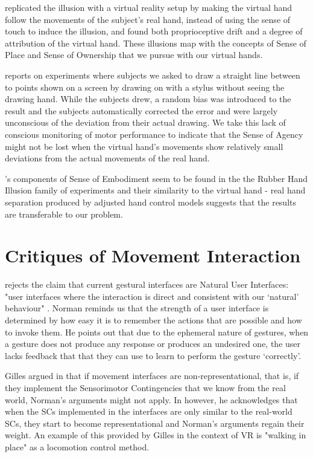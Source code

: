 \parencite{Sanchez-Vives2010} replicated the illusion with a virtual reality setup by making the virtual hand follow the movements of the subject's real hand, instead of using the sense of touch to induce the illusion, and found both proprioceptive drift and a degree of attribution of the virtual hand. These illusions map with the concepts of Sense of Place and Sense of Ownership that we pursue with our virtual hands.

\parencite{Fourneret1998} reports on experiments where subjects we asked to draw a straight line between to points shown on a screen by drawing on with a stylus without seeing the drawing hand. While the subjects drew, a random bias was introduced to the result and the subjects automatically corrected the error and were largely unconscious of the deviation from their actual drawing. We take this lack of conscious monitoring of motor performance to indicate that the Sense of Agency might not be lost when the virtual hand's movements show relatively small deviations from the actual movements of the real hand.

\parencite{Kilteni2012}'s components of Sense of Embodiment seem to be found in the the Rubber Hand Illusion family of experiments and their similarity to the virtual hand - real hand separation produced by adjusted hand control models suggests that the results are transferable to our problem.

\section{Critiques of Movement Interaction}
\label{sec:critiquesMovementInteraction}

\parencite{Norman2010} rejects the claim that current gestural interfaces are Natural User Interfaces: "user interfaces where the interaction is direct and consistent with our ‘natural’ behaviour" \parencite{HvasMortensen2017}. Norman reminds us that the strength of a user interface is determined by how easy it is to remember the actions that are possible and how to invoke them. He points out that due to the ephemeral nature of gestures, when a gesture does not produce any response or produces an undesired one, the user lacks feedback that that they can use to learn to perform the gesture ‘correctly’.

Gilles argued in \parencite{Gillies2014} that if movement interfaces are non-representational, that is, if they implement the Sensorimotor Contingencies that we know from the real world, Norman's arguments might not apply. In \parencite{Gillies2016} however, he acknowledges that when the SCs implemented in the interfaces are only similar to the real-world SCs, they start to become representational and Norman's arguments regain their weight. An example of this provided by Gilles in the context of VR is "walking in place" as a locomotion control method.

